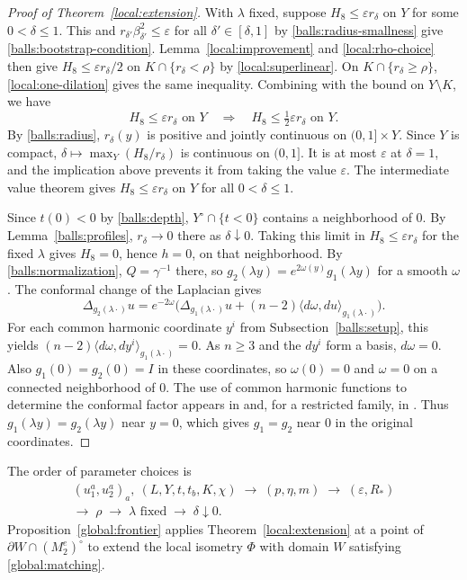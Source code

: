 \documentclass[11pt,a4paper]{article}
\theoremstyle{definition}
\theoremstyle{remark}
\numberwithin{equation}{section}
\begin{document}
\begin{proof}[Proof of Theorem~\ref{local:extension}]
With $\lambda$ fixed, suppose $H_8\le\varepsilon r_\delta$ on $Y$
for some $0<\delta\le1$. This and $r_{\delta'}\beta_{\delta'}^2
\le\varepsilon$ for all $\delta'\in[\delta,1]$ by
\eqref{balls:radius-smallness} give \eqref{balls:bootstrap-condition}. Lemma~\ref{local:improvement}
and \eqref{local:rho-choice} then give
$H_8\le\varepsilon r_\delta/2$ on $K\cap\{r_\delta<\rho\}$ by
\eqref{local:superlinear}. On $K\cap\{r_\delta\ge\rho\}$,
\eqref{local:one-dilation} gives the same inequality.
Combining with the bound on $Y\setminus K$, we have
\[
 H_8\le\varepsilon r_\delta\text{ on }Y
 \quad\Longrightarrow\quad H_8\le\tfrac12\varepsilon r_\delta
 \text{ on }Y.
\]
By \eqref{balls:radius}, $r_\delta(y)$ is positive and jointly
continuous on $(0,1]\times Y$. Since $Y$ is compact,
$\delta\mapsto\max_Y(H_8/r_\delta)$ is continuous on $(0,1]$.
It is at most $\varepsilon$ at $\delta=1$, and the implication
above prevents it from taking the value $\varepsilon$.
The intermediate value theorem gives $H_8\le\varepsilon r_\delta$
on $Y$ for all $0<\delta\le1$.

Since $t(0)<0$ by \eqref{balls:depth}, $Y^\circ\cap\{t<0\}$ contains
a neighborhood of $0$. By Lemma~\ref{balls:profiles},
$r_\delta\to0$ there as $\delta\downarrow0$. Taking this limit
in $H_8\le\varepsilon r_\delta$ for the fixed $\lambda$ gives
$H_8=0$, hence $h=0$, on that neighborhood.
By \eqref{balls:normalization}, $Q=\gamma^{-1}$ there, so
$g_2(\lambda y)=e^{2\omega(y)}g_1(\lambda y)$ for a smooth $\omega$.
The conformal change of the Laplacian gives
\[
 \Delta_{g_2(\lambda\cdot)}u
 =e^{-2\omega}\bigl(\Delta_{g_1(\lambda\cdot)}u
       +(n-2)\langle d\omega,du\rangle_{g_1(\lambda\cdot)}\bigr).
\]
For each common harmonic coordinate $y^i$ from
Subsection~\ref{balls:setup}, this yields
$(n-2)\langle d\omega,dy^i\rangle_{g_1(\lambda\cdot)}=0$.
As $n\ge3$ and the $dy^i$ form a basis, $d\omega=0$. Also
$g_1(0)=g_2(0)=I$ in these coordinates,
so $\omega(0)=0$ and $\omega=0$ on a connected neighborhood of $0$.
The use of common harmonic functions to determine the conformal
factor appears in \citep[Section~8]{Fuglede1978} and, for a
restricted family, in \citep[Proposition~4.1]{LLS20}.
Thus $g_1(\lambda y)=g_2(\lambda y)$ near $y=0$, which gives
$g_1=g_2$ near $0$ in the original coordinates.
\end{proof}

The order of parameter choices is
\begin{equation}\label{local:parameter-order}
 \begin{gathered}
 (u_1^a,u_2^a)_a,\ (L,Y,t,t_b,K,\chi)
   \;\longrightarrow\;(p,\eta,m)
   \;\longrightarrow\;(\varepsilon,R_*)\\
 \longrightarrow\;\rho\;\longrightarrow\;
 \lambda\text{ fixed}\;\longrightarrow\;\delta\downarrow0.
 \end{gathered}
\end{equation}
Proposition~\ref{global:frontier} applies Theorem~\ref{local:extension}
at a point of $\partial W\cap(M_2^e)^\circ$ to extend the local
isometry $\Phi$ with domain $W$ satisfying \eqref{global:matching}.
\end{document}
